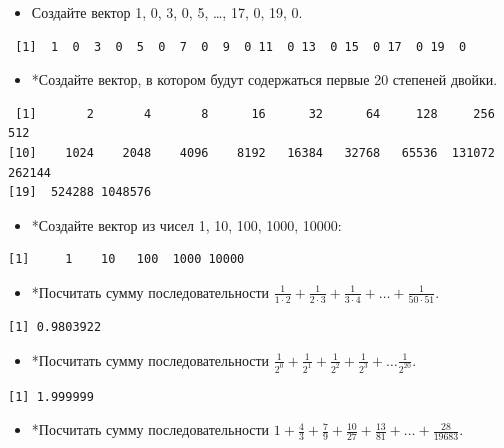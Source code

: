 \documentclass[
]{book}
\providecommand{\tightlist}{%
  \setlength{\itemsep}{0pt}\setlength{\parskip}{0pt}}
\begin{document}
\begin{itemize}
\tightlist
\item
  Создайте вектор 1, 0, 3, 0, 5, \ldots, 17, 0, 19, 0.
\end{itemize}

\begin{verbatim}
 [1]  1  0  3  0  5  0  7  0  9  0 11  0 13  0 15  0 17  0 19  0
\end{verbatim}

\begin{itemize}
\tightlist
\item
  *Создайте вектор, в котором будут содержаться первые 20 степеней двойки.
\end{itemize}

\begin{verbatim}
 [1]       2       4       8      16      32      64     128     256     512
[10]    1024    2048    4096    8192   16384   32768   65536  131072  262144
[19]  524288 1048576
\end{verbatim}

\begin{itemize}
\tightlist
\item
  *Создайте вектор из чисел 1, 10, 100, 1000, 10000:
\end{itemize}

\begin{verbatim}
[1]     1    10   100  1000 10000
\end{verbatim}

\begin{itemize}
\tightlist
\item
  *Посчитать сумму последовательности \(\frac{1}{1 \cdot 2}+\frac{1}{2 \cdot 3}+\frac{1}{3 \cdot 4}+\ldots+\frac{1}{50 \cdot 51}\).
\end{itemize}

\begin{verbatim}
[1] 0.9803922
\end{verbatim}

\begin{itemize}
\tightlist
\item
  *Посчитать сумму последовательности \(\frac{1}{2^{0}}+\frac{1}{2^{1}}+\frac{1}{2^{2}}+\frac{1}{2^{3}}+\ldots \frac{1}{2^{20}}\).
\end{itemize}

\begin{verbatim}
[1] 1.999999
\end{verbatim}

\begin{itemize}
\tightlist
\item
  *Посчитать сумму последовательности \(1+\frac{4}{3}+\frac{7}{9}+\frac{10}{27}+\frac{13}{81}+\ldots+\frac{28}{19683}\).
\end{itemize}
\end{document}
